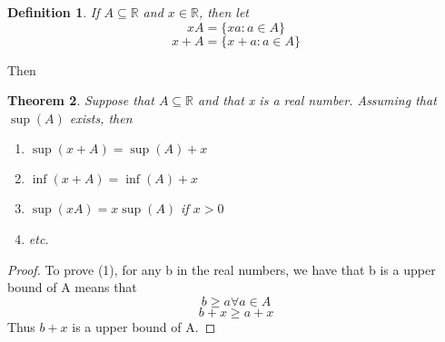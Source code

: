 \documentclass{article}
\newtheorem{theorem}{Theorem}[section]
\newtheorem{definition}[theorem]{Definition}
\begin{document}
\begin{definition}
    If $A \subseteq \mathbb{R}$ and $x \in \mathbb{R}$, then let 
    \begin{equation}
        xA = \{xa : a \in A\}
    \end{equation}
    \begin{equation}
        x + A = \{x + a : a \in A\}
    \end{equation}
\end{definition}

Then

\begin{theorem}
    Suppose that $A \subseteq \mathbb{R}$ and that x is a real number. Assuming that $\sup(A)$ exists, then 
    \begin{enumerate}
        \item $\sup(x + A) = \sup(A) + x$
        \item $\inf(x + A) = \inf(A) + x$
        \item $\sup(xA) = x\sup(A)$ if $x > 0$
        \item etc. 
    \end{enumerate}
\end{theorem}

\begin{proof}
    To prove (1), for any b in the real numbers, we have that b is a upper bound of A means that 
    \begin{equation}
        b \geq a \forall a \in A
    \end{equation}
    \begin{equation}
        b + x \geq a + x
    \end{equation}
    Thus $b + x$ is a upper bound of A. 
\end{proof}
\end{document}
